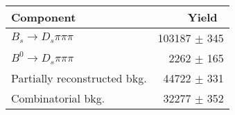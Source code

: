 \begin{tabular}{l r }
\hline\hline
Component & Yield\ \\
\hline
$B_s \to D_s \pi \pi \pi$ & 103187 $\pm$ 345 \\
$B^{0} \to D_s \pi \pi \pi$ & 2262 $\pm$ 165 \\
Partially reconstructed bkg. & 44722 $\pm$ 331 \\
Combinatorial bkg. & 32277 $\pm$ 352 \\
\hline\hline
\end{tabular}
\label{table:normYields}
